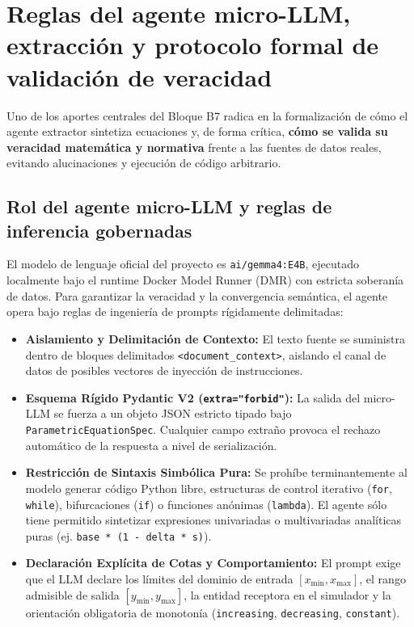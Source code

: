 \documentclass[11pt,a4paper]{article}
\begin{document}
\section{Reglas del agente micro-LLM, extracci\'on y protocolo formal de validaci\'on de veracidad}

Uno de los aportes centrales del Bloque B7 radica en la formalizaci\'on de c\'omo el agente extractor sintetiza ecuaciones y, de forma cr\'itica, \textbf{c\'omo se valida su veracidad matem\'atica y normativa} frente a las fuentes de datos reales, evitando alucinaciones y ejecuci\'on de c\'odigo arbitrario.

\subsection{Rol del agente micro-LLM y reglas de inferencia gobernadas}

El modelo de lenguaje oficial del proyecto es \texttt{ai/gemma4:E4B}, ejecutado localmente bajo el runtime Docker Model Runner (DMR) con estricta soberan\'ia de datos. Para garantizar la veracidad y la convergencia sem\'antica, el agente opera bajo reglas de ingenier\'ia de prompts r\'igidamente delimitadas:

\begin{itemize}[leftmargin=*]
    \item \textbf{Aislamiento y Delimitaci\'on de Contexto:} El texto fuente se suministra dentro de bloques delimitados \texttt{<document\_context>}, aislando el canal de datos de posibles vectores de inyecci\'on de instrucciones.
    \item \textbf{Esquema R\'igido Pydantic V2 (\texttt{extra="forbid"}):} La salida del micro-LLM se fuerza a un objeto JSON estricto tipado bajo \texttt{ParametricEquationSpec}. Cualquier campo extra\~no provoca el rechazo autom\'atico de la respuesta a nivel de serializaci\'on.
    \item \textbf{Restricci\'on de Sintaxis Simb\'olica Pura:} Se proh\'ibe terminantemente al modelo generar c\'odigo Python libre, estructuras de control iterativo (\texttt{for}, \texttt{while}), bifurcaciones (\texttt{if}) o funciones an\'onimas (\texttt{lambda}). El agente s\'olo tiene permitido sintetizar expresiones univariadas o multivariadas anal\'iticas puras (ej. \texttt{base * (1 - delta * s)}).
    \item \textbf{Declaraci\'on Expl\'icita de Cotas y Comportamiento:} El prompt exige que el LLM declare los l\'imites del dominio de entrada $[x_{\min}, x_{\max}]$, el rango admisible de salida $[y_{\min}, y_{\max}]$, la entidad receptora en el simulador y la orientaci\'on obligatoria de monoton\'ia (\texttt{increasing}, \texttt{decreasing}, \texttt{constant}).
\end{itemize}
\end{document}
